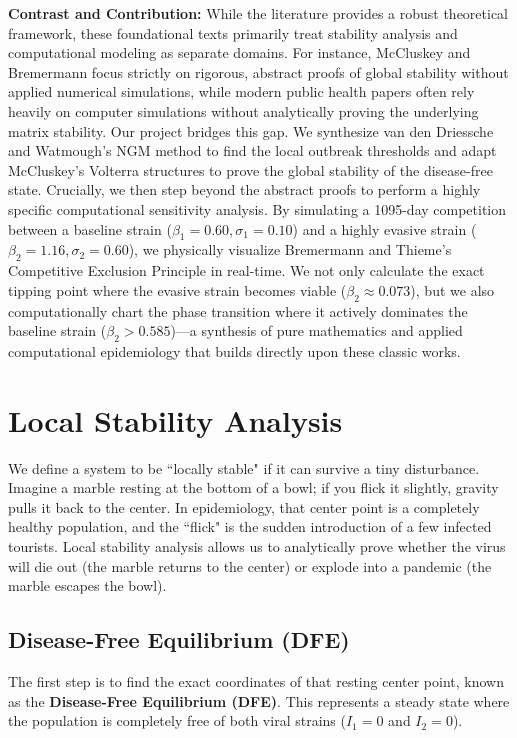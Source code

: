 \documentclass[12pt]{article}
\begin{document}
\textbf{Contrast and Contribution:} 
While the literature provides a robust theoretical framework, these foundational texts primarily treat stability analysis and computational modeling as separate domains. For instance, McCluskey and Bremermann focus strictly on rigorous, abstract proofs of global stability without applied numerical simulations, while modern public health papers often rely heavily on computer simulations without analytically proving the underlying matrix stability. 
Our project bridges this gap. We synthesize van den Driessche and Watmough's NGM method to find the local outbreak thresholds and adapt McCluskey's Volterra structures to prove the global stability of the disease-free state. Crucially, we then step beyond the abstract proofs to perform a highly specific computational sensitivity analysis. By simulating a 1095-day competition between a baseline strain ($\beta_1 = 0.60, \sigma_1 = 0.10$) and a highly evasive strain ($\beta_2 = 1.16, \sigma_2 = 0.60$), we physically visualize Bremermann and Thieme's Competitive Exclusion Principle in real-time. We not only calculate the exact tipping point where the evasive strain becomes viable ($\beta_2 \approx 0.073$), but we also computationally chart the phase transition where it actively dominates the baseline strain ($\beta_2 > 0.585$)—a synthesis of pure mathematics and applied computational epidemiology that builds directly upon these classic works.


\section{Local Stability Analysis}

We define a system to be ``locally stable" if it can survive a tiny disturbance. Imagine a marble resting at the bottom of a bowl; if you flick it slightly, gravity pulls it back to the center. In epidemiology, that center point is a completely healthy population, and the ``flick" is the sudden introduction of a few infected tourists. Local stability analysis allows us to analytically prove whether the virus will die out (the marble returns to the center) or explode into a pandemic (the marble escapes the bowl).

\subsection{Disease-Free Equilibrium (DFE)}
The first step is to find the exact coordinates of that resting center point, known as the \textbf{Disease-Free Equilibrium (DFE)}. This represents a steady state where the population is completely free of both viral strains ($I_1 = 0$ and $I_2 = 0$).
\end{document}
